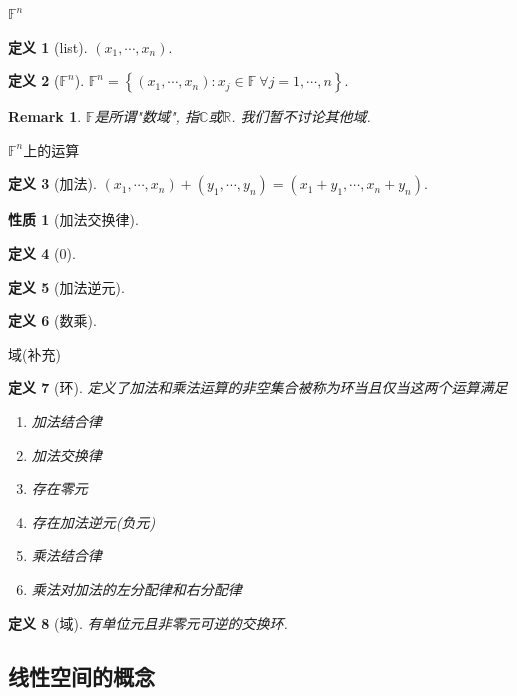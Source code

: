 \documentclass[11pt]{beamer}
\newtheorem{defi}{定义}[section]
\newtheorem{prop}{性质}[section]
\newtheorem{rmk}{Remark}[section]
\begin{document}
\begin{frame}{$\mathbb{F}^n$}
	\begin{defi}[list]
		$\left(x_1,\cdots,x_n\right).$
	\end{defi}
	\begin{defi}[$\mathbb{F}^n$]
		$\mathbb{F}^n=\left\{\left(x_1,\cdots,x_n\right):x_j\in\mathbb{F}\ \forall j=1,\cdots,n \right\}. $
	\end{defi}
	\begin{rmk}
		$\mathbb{F}$是所谓"数域", 指$\mathbb{C}$或$\mathbb{R}$. 我们暂不讨论其他域.
	\end{rmk}
\end{frame}

\begin{frame}{$\mathbb{F}^n$上的运算}
	\begin{defi}[加法]
		$\left(x_1,\cdots,x_n\right)+\left(y_1,\cdots,y_n\right)=\left(x_1+y_1,\cdots,x_n+y_n\right).$
	\end{defi}
	\begin{prop}[加法交换律]
	\end{prop}
	\begin{defi}[0]
	\end{defi}
	\begin{defi}[加法逆元]
	\end{defi}
	\begin{defi}[数乘]
	\end{defi}
\end{frame}

\begin{frame}{域(补充)}
	\begin{defi}[环]
		定义了加法和乘法运算的非空集合被称为环当且仅当这两个运算满足
		\begin{enumerate}
			\item 加法结合律
			\item 加法交换律
			\item 存在零元
			\item 存在加法逆元(负元)
			\item 乘法结合律
			\item 乘法对加法的左分配律和右分配律
		\end{enumerate}
	\end{defi}
	\begin{defi}[域]
		有单位元且非零元可逆的交换环.
	\end{defi}
\end{frame}

\subsection{线性空间的概念}
\frame{\subsectionpage}
\end{document}
